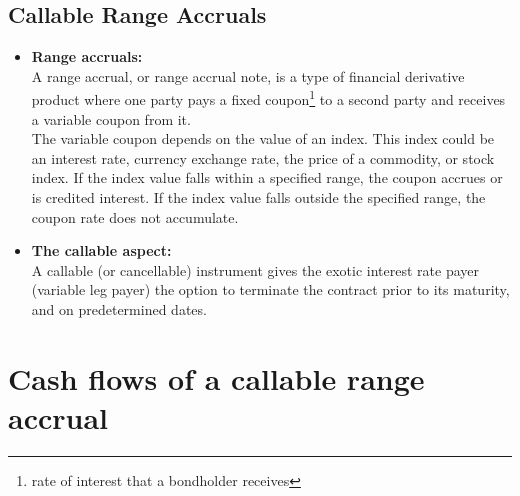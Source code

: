 \documentclass[letterpaper, 10 pt, conference]{IEEEtran}
\begin{document}
		\subsection{Callable Range Accruals}
			\begin{itemize}
				\item {\small \bf Range accruals:}\\
				A range accrual, or range accrual note, is a type of financial derivative product where one party pays a fixed coupon\footnote{rate of interest that a bondholder receives} to a second party and receives a variable coupon from it.\\
				The variable coupon depends on the value of an index. This index could be an interest rate, currency exchange rate, the price of a commodity, or stock index. If the index value falls within a specified range, the coupon accrues or is credited interest. If the index value falls outside the specified range, the coupon rate does not accumulate.
				\\
				\item {\small \bf The callable aspect:}\\
				A callable (or cancellable) instrument gives the exotic interest rate payer (variable leg payer) the option to terminate the contract prior to its maturity, and on predetermined dates.
			\end{itemize}
			\section{Cash flows of a callable range accrual}
				
\end{document}
